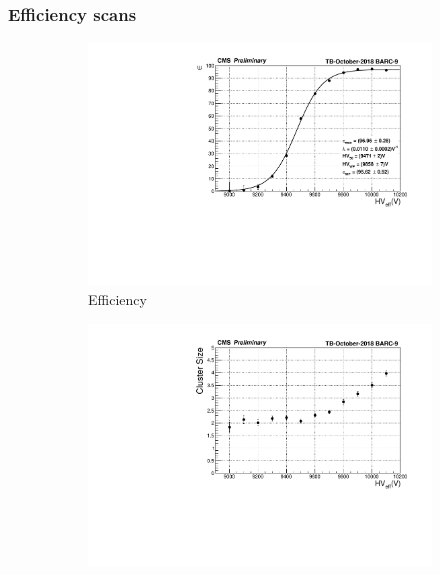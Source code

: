 \newpage
	
		\subsubsection{Efficiency scans}
		\label{chapt5:sssec:effscan}
	
\begingroup\setlength{\intextsep}{0pt}\setlength{\columnsep}{15pt}
	
	\begin{figure}
		\begin{subfigure}{\linewidth}
			\centering
			\includegraphics[width = \linewidth]{fig/chapt5/HV-Scan-Efficiency.pdf}
			\caption{\label{fig:efficiency-scan:A} Efficiency}
		\end{subfigure}
		\begin{subfigure}{\linewidth}
			\centering
			\includegraphics[width = \linewidth]{fig/chapt5/HV-Scan-ClS.pdf}\\

\end{subfigure}
\end{figure}
